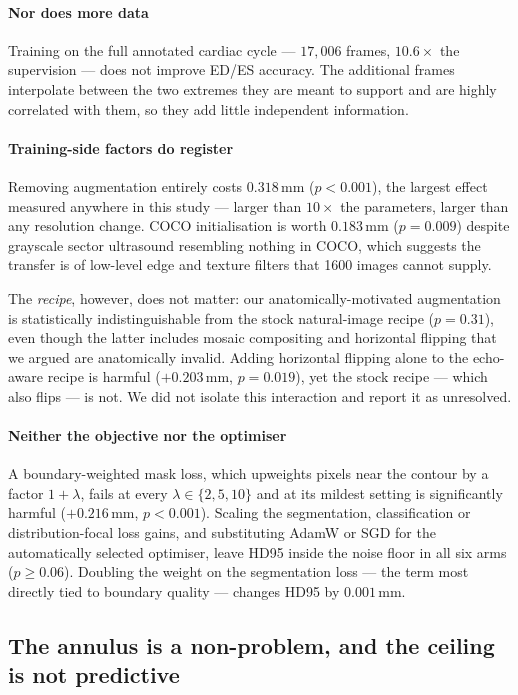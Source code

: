 \paragraph{Nor does more data} Training on the full annotated cardiac cycle ---
$17{,}006$ frames, $10.6\times$ the supervision --- does not improve ED/ES
accuracy. The additional frames interpolate between the two extremes they are
meant to support and are highly correlated with them, so they add little
independent information.

\paragraph{Training-side factors do register} Removing augmentation entirely
costs $0.318$\,mm ($p{<}0.001$), the largest effect measured anywhere in this
study --- larger than $10\times$ the parameters, larger than any resolution
change. COCO initialisation is worth $0.183$\,mm ($p{=}0.009$) despite grayscale
sector ultrasound resembling nothing in COCO, which suggests the transfer is of
low-level edge and texture filters that 1600 images cannot supply.

The \emph{recipe}, however, does not matter: our anatomically-motivated
augmentation is statistically indistinguishable from the stock natural-image
recipe ($p{=}0.31$), even though the latter includes mosaic compositing and
horizontal flipping that we argued are anatomically invalid. Adding horizontal
flipping alone to the echo-aware recipe is harmful ($+0.203$\,mm, $p{=}0.019$),
yet the stock recipe --- which also flips --- is not. We did not isolate this
interaction and report it as unresolved.

\paragraph{Neither the objective nor the optimiser} A boundary-weighted mask
loss, which upweights pixels near the contour by a factor $1+\lambda$, fails at
every $\lambda \in \{2,5,10\}$ and at its mildest setting is significantly
harmful ($+0.216$\,mm, $p{<}0.001$). Scaling the segmentation, classification or
distribution-focal loss gains, and substituting AdamW or SGD for the
automatically selected optimiser, leave HD95 inside the noise floor in all six
arms ($p \geq 0.06$). Doubling the weight on the segmentation loss --- the term
most directly tied to boundary quality --- changes HD95 by $0.001$\,mm.

\subsection{The annulus is a non-problem, and the ceiling is not predictive}

